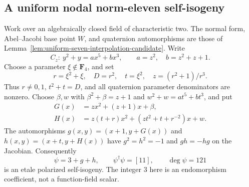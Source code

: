 \subsection{A uniform nodal norm-eleven self-isogeny}
\label{subsec:uniform-eleven-theta-candidate}

Work over an algebraically closed field of characteristic two.  The
normal form, Abel--Jacobi base point $W$, and quaternion automorphisms
are those of Lemma~\ref{lem:uniform-seven-interpolation-candidate}.
Write
\[
 C_z:\ y^2+y=ax^5+bx^3,\qquad a=z^2,\quad b=z^2+z+1.
\]
Choose a parameter $\xi\notin\mathbf F_4$, and set
\[
 r=\xi^2+\xi,\quad D=r^2,\quad t=\xi^2,\quad
 z=(r^2+1)/r^3.
 \tag{E11.1}
\]
Thus $r\ne0,1$, $t^2+t=D$, and all quaternion parameter denominators
are nonzero. Choose $\beta,w$ with
$\beta^2+\beta=z+1$ and $w^2+w=at^5+bt^3$, and put
\[
 \begin{split}
 G(x)&=zx^2+(z+1)x+\beta,\\
 H(x)&=z(t+r)x^2+(zt^2+t+r^{-2})x+w.
 \end{split}
\]
The automorphisms $g(x,y)=(x+1,y+G(x))$ and
$h(x,y)=(x+t,y+H(x))$ have $g^2=h^2=-1$ and $gh=-hg$ on the
Jacobian. Consequently
\[
 \psi=3+g+h,\qquad \psi^\dagger\psi=[11],\qquad \deg\psi=121
 \tag{E11.2}
\]
is an etale polarized self-isogeny. The integer $3$ here is an
endomorphism coefficient, not a function-field scalar.

